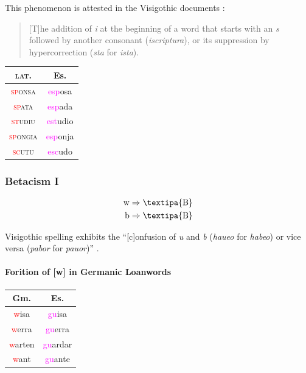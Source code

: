 \documentclass{report}[12pt]
\begin{document}
This phenomenon is attested in the Visigothic documents \parencite[p.~159]{latin_palaeography}:
\begin{quote}
  [T]he addition of \emph{i} at the beginning of a word that starts with an \emph{s} followed by another consonant (\emph{iscriptura}), or its suppression by hypercorrection (\emph{sta} for \emph{ista}).
\end{quote}

\begin{tabular}{c c}
  \textsc{lat.} & Es. \\
  \hline
  \textsc{\textcolor{red}{sp}onsa} & \textcolor{magenta}{esp}osa \\
  \textsc{\textcolor{red}{sp}ata} & \textcolor{magenta}{esp}ada \\
  \textsc{\textcolor{red}{st}udiu} & \textcolor{magenta}{est}udio \\
  \textsc{\textcolor{red}{sp}ongia} & \textcolor{magenta}{esp}onja \\
  \textsc{\textcolor{red}{sc}utu} & \textcolor{magenta}{esc}udo \\
\end{tabular}

\subsubsection*{Betacism I}

\begin{tcolorbox}
  \begin{align*}
    \text{w} & \Rightarrow \text{\textipa{B}} \\
    \text{b} & \Rightarrow \text{\textipa{B}} \\
  \end{align*}
\end{tcolorbox}

Visigothic spelling exhibits the ``[c]onfusion of \emph{u} and \emph{b} (\emph{haueo} for \emph{habeo}) or vice versa (\emph{pabor} for \emph{pauor})'' \parencite[p.~159]{latin_palaeography}.

\paragraph{Forition of [w] in Germanic Loanwords}

\begin{center}
\begin{tabular}{c c}
  Gm. & Es. \\  
  \hline
  \textcolor{red}{w}isa & \textcolor{magenta}{gu}isa \\
  \textcolor{red}{w}erra & \textcolor{magenta}{gu}erra \\
  \textcolor{red}{w}arten & \textcolor{magenta}{gu}ardar \\
  \textcolor{red}{w}ant & \textcolor{magenta}{gu}ante \\  
\end{tabular}
\end{center}
\end{document}
